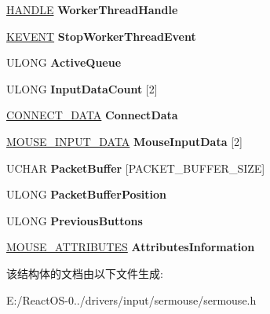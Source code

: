 \begin{DoxyCompactItemize}
\hyperlink{interfacevoid}{H\+A\+N\+D\+LE} {\bfseries Worker\+Thread\+Handle}
\item 
\mbox{\label{struct___s_e_r_m_o_u_s_e___d_e_v_i_c_e___e_x_t_e_n_s_i_o_n_a23be1e6130be88156ae16895c6e23892}} 
\hyperlink{struct___k_e_v_e_n_t}{K\+E\+V\+E\+NT} {\bfseries Stop\+Worker\+Thread\+Event}
\item 
\mbox{\label{struct___s_e_r_m_o_u_s_e___d_e_v_i_c_e___e_x_t_e_n_s_i_o_n_aa36751b7cbed40f5de25a3e93afe7931}} 
U\+L\+O\+NG {\bfseries Active\+Queue}
\item 
\mbox{\label{struct___s_e_r_m_o_u_s_e___d_e_v_i_c_e___e_x_t_e_n_s_i_o_n_a4d69b37d1703014f605ae9ca8a51e839}} 
U\+L\+O\+NG {\bfseries Input\+Data\+Count} \mbox{[}2\mbox{]}
\item 
\mbox{\label{struct___s_e_r_m_o_u_s_e___d_e_v_i_c_e___e_x_t_e_n_s_i_o_n_a47f5d431f09ac57260e053ff5f976271}} 
\hyperlink{struct___c_o_n_n_e_c_t___d_a_t_a}{C\+O\+N\+N\+E\+C\+T\+\_\+\+D\+A\+TA} {\bfseries Connect\+Data}
\item 
\mbox{\label{struct___s_e_r_m_o_u_s_e___d_e_v_i_c_e___e_x_t_e_n_s_i_o_n_afb0789d8ceb45501683b042e866381ac}} 
\hyperlink{struct___m_o_u_s_e___i_n_p_u_t___d_a_t_a}{M\+O\+U\+S\+E\+\_\+\+I\+N\+P\+U\+T\+\_\+\+D\+A\+TA} {\bfseries Mouse\+Input\+Data} \mbox{[}2\mbox{]}
\item 
\mbox{\label{struct___s_e_r_m_o_u_s_e___d_e_v_i_c_e___e_x_t_e_n_s_i_o_n_a7d1f5b94ac384aa6b67d4c40a776d231}} 
U\+C\+H\+AR {\bfseries Packet\+Buffer} \mbox{[}P\+A\+C\+K\+E\+T\+\_\+\+B\+U\+F\+F\+E\+R\+\_\+\+S\+I\+ZE\mbox{]}
\item 
\mbox{\label{struct___s_e_r_m_o_u_s_e___d_e_v_i_c_e___e_x_t_e_n_s_i_o_n_a67428ed5ead491a5aca9e9682d1a6d21}} 
U\+L\+O\+NG {\bfseries Packet\+Buffer\+Position}
\item 
\mbox{\label{struct___s_e_r_m_o_u_s_e___d_e_v_i_c_e___e_x_t_e_n_s_i_o_n_a532de45defa835ff2470125a0606f6e4}} 
U\+L\+O\+NG {\bfseries Previous\+Buttons}
\item 
\mbox{\label{struct___s_e_r_m_o_u_s_e___d_e_v_i_c_e___e_x_t_e_n_s_i_o_n_a6e7095a6994a9507f4935d6bd6fbb8c9}} 
\hyperlink{struct___m_o_u_s_e___a_t_t_r_i_b_u_t_e_s}{M\+O\+U\+S\+E\+\_\+\+A\+T\+T\+R\+I\+B\+U\+T\+ES} {\bfseries Attributes\+Information}
\end{DoxyCompactItemize}


该结构体的文档由以下文件生成\+:\begin{DoxyCompactItemize}
\item 
E\+:/\+React\+O\+S-\/0../drivers/input/sermouse/sermouse.\+h\end{DoxyCompactItemize}
